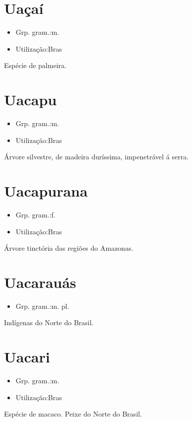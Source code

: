 \documentclass{article}
\begin{document}
\section{Uaçaí}
\begin{itemize}
\item {Grp. gram.:m.}
\end{itemize}
\begin{itemize}
\item {Utilização:Bras}
\end{itemize}
Espécie de palmeira.
\section{Uacapu}
\begin{itemize}
\item {Grp. gram.:m.}
\end{itemize}
\begin{itemize}
\item {Utilização:Bras}
\end{itemize}
Árvore silvestre, de madeira duríssima, impenetrável á serra.
\section{Uacapurana}
\begin{itemize}
\item {Grp. gram.:f.}
\end{itemize}
\begin{itemize}
\item {Utilização:Bras}
\end{itemize}
Árvore tinctória das regiões do Amazonas.
\section{Uacarauás}
\begin{itemize}
\item {Grp. gram.:m. pl.}
\end{itemize}
Indígenas do Norte do Brasil.
\section{Uacari}
\begin{itemize}
\item {Grp. gram.:m.}
\end{itemize}
\begin{itemize}
\item {Utilização:Bras}
\end{itemize}
Espécie de macaco.
Peixe do Norte do Brasil.
\end{document}
